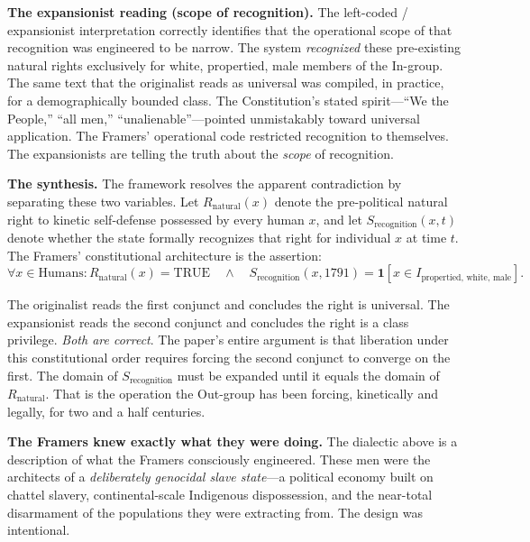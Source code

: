 \textbf{The expansionist reading (scope of recognition).} The left-coded / expansionist interpretation correctly identifies that the operational scope of that recognition was engineered to be narrow. The system \textit{recognized} these pre-existing natural rights exclusively for white, propertied, male members of the In-group. The same text that the originalist reads as universal was compiled, in practice, for a demographically bounded class. The Constitution's stated spirit---``We the People,'' ``all men,'' ``unalienable''---pointed unmistakably toward universal application. The Framers' operational code restricted recognition to themselves. The expansionists are telling the truth about the \textit{scope} of recognition.

\textbf{The synthesis.} The framework resolves the apparent contradiction by separating these two variables. Let $R_{\text{natural}}(x)$ denote the pre-political natural right to kinetic self-defense possessed by every human $x$, and let $S_{\text{recognition}}(x, t)$ denote whether the state formally recognizes that right for individual $x$ at time $t$. The Framers' constitutional architecture is the assertion:
\begin{equation}\label{eq:const_dialectic}
\forall x \in \text{Humans}: R_{\text{natural}}(x) = \text{TRUE} \quad \land \quad S_{\text{recognition}}(x, 1791) = \mathbf{1}[x \in I_{\text{propertied, white, male}}].
\end{equation}

The originalist reads the first conjunct and concludes the right is universal. The expansionist reads the second conjunct and concludes the right is a class privilege. \textit{Both are correct}. The paper's entire argument is that liberation under this constitutional order requires forcing the second conjunct to converge on the first. The domain of $S_{\text{recognition}}$ must be expanded until it equals the domain of $R_{\text{natural}}$. That is the operation the Out-group has been forcing, kinetically and legally, for two and a half centuries.

\textbf{The Framers knew exactly what they were doing.} The dialectic above is a description of what the Framers consciously engineered. These men were the architects of a \textit{deliberately genocidal slave state}---a political economy built on chattel slavery, continental-scale Indigenous dispossession, and the near-total disarmament of the populations they were extracting from. The design was intentional.

